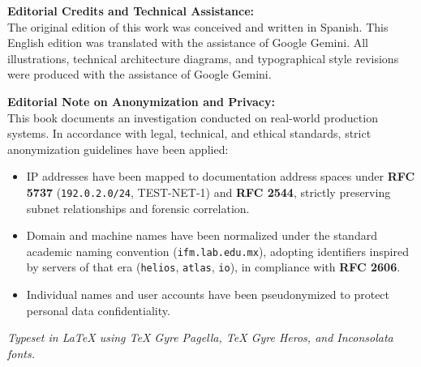 {\vspace{1.0em}
\noindent
\textbf{Editorial Credits and Technical Assistance:}\\
The original edition of this work was conceived and written in Spanish. This English edition was translated with the assistance of Google Gemini. All illustrations, technical architecture diagrams, and typographical style revisions were produced with the assistance of Google Gemini.

\vspace{1.0em}
\noindent
\textbf{Editorial Note on Anonymization and Privacy:}\\
This book documents an investigation conducted on real-world production systems. In accordance with legal, technical, and ethical standards, strict anonymization guidelines have been applied:
\begin{itemize}\setlength{\itemsep}{0pt}\setlength{\parskip}{0pt}
    \item IP addresses have been mapped to documentation address spaces under \textbf{RFC 5737} (\texttt{192.0.2.0/24}, TEST-NET-1) and \textbf{RFC 2544}, strictly preserving subnet relationships and forensic correlation.
    \item Domain and machine names have been normalized under the standard academic naming convention (\texttt{ifm.lab.edu.mx}), adopting identifiers inspired by servers of that era (\texttt{helios}, \texttt{atlas}, \texttt{io}), in compliance with \textbf{RFC 2606}.
    \item Individual names and user accounts have been pseudonymized to protect personal data confidentiality.
\end{itemize}

\vspace{0.8em}
\noindent
\textit{Typeset in \LaTeX{} using TeX Gyre Pagella, TeX Gyre Heros, and Inconsolata fonts.}
}
\newpage
